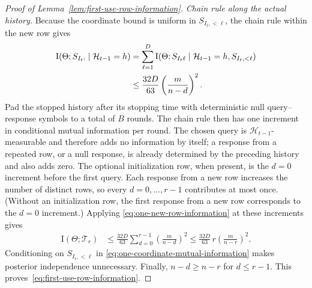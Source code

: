 \documentclass[10pt,a4paper]{amsart}
\begin{document}
\begin{proof}[Proof of Lemma~\ref{lem:first-use-row-information}]
\emph{Chain rule along the actual history.}
Because the coordinate bound is uniform in $S_{I_t,<\ell}$, the chain rule
within the new row gives
\begin{align}
 \mathrm I(\Theta;S_{I_t:}\mid\mathcal H_{t-1}=h)
 &=\sum_{\ell=1}^D
   \mathrm I(\Theta;S_{I_t\ell}
   \mid\mathcal H_{t-1}=h,S_{I_t,<\ell})
   \notag\\
 &\le \frac{32D}{63}\left(\frac{m}{n-d}\right)^2.
 \label{eq:one-new-row-information}
\end{align}
Pad the stopped history after its stopping time with deterministic null
query--response symbols to a total of $B$ rounds.  The chain rule then has one
increment in conditional mutual information per round.  The chosen query is
$\mathcal H_{t-1}$-measurable and therefore adds no information by itself; a
response from a repeated row, or a null response, is already determined by the
preceding history and also adds zero.
The optional initialization row, when present, is the $d=0$ increment before
the first query.  Each response from a new row increases the number of distinct rows, so
every $d=0,\ldots,r-1$ contributes at most once.  (Without an initialization
row, the first response from a new row corresponds to the $d=0$ increment.)  Applying
\eqref{eq:one-new-row-information} at these increments gives
\begin{align*}
 \mathrm I(\Theta;\mathcal T_r)
 &\le \frac{32D}{63}
 \sum_{d=0}^{r-1}\left(\frac{m}{n-d}\right)^2
 \le \frac{32D}{63}\,
 r\left(\frac{m}{n-r}\right)^2.
\end{align*}
Conditioning on $S_{I_t,<\ell}$ in
\eqref{eq:one-coordinate-mutual-information} makes posterior independence
unnecessary.  Finally, $n-d\ge n-r$ for $d\le r-1$.  This
proves~\eqref{eq:first-use-row-information}.
\end{proof}
\end{document}

